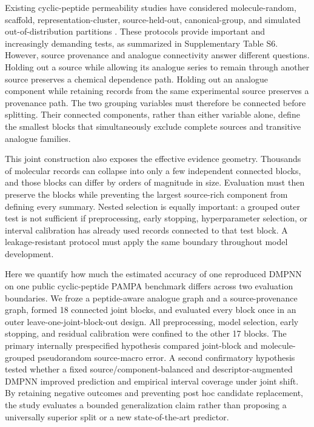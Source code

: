 \documentclass[referee,lineno,pdflatex,sn-vancouver-num]{sn-jnl}
\begin{document}
Existing cyclic-peptide permeability studies have considered molecule-random, scaffold, representation-cluster, source-held-out, canonical-group, and simulated out-of-distribution partitions \cite{geyland2024applicability,liu2025benchmark,feller2025peptideclm,wang2025multicycpermea}. These protocols provide important and increasingly demanding tests, as summarized in Supplementary Table S6. However, source provenance and analogue connectivity answer different questions. Holding out a source while allowing its analogue series to remain through another source preserves a chemical dependence path. Holding out an analogue component while retaining records from the same experimental source preserves a provenance path. The two grouping variables must therefore be connected before splitting. Their connected components, rather than either variable alone, define the smallest blocks that simultaneously exclude complete sources and transitive analogue families.

This joint construction also exposes the effective evidence geometry. Thousands of molecular records can collapse into only a few independent connected blocks, and those blocks can differ by orders of magnitude in size. Evaluation must then preserve the blocks while preventing the largest source-rich component from defining every summary. Nested selection is equally important: a grouped outer test is not sufficient if preprocessing, early stopping, hyperparameter selection, or interval calibration has already used records connected to that test block. A leakage-resistant protocol must apply the same boundary throughout model development.

Here we quantify how much the estimated accuracy of one reproduced DMPNN on one public cyclic-peptide PAMPA benchmark differs across two evaluation boundaries. We froze a peptide-aware analogue graph and a source-provenance graph, formed 18 connected joint blocks, and evaluated every block once in an outer leave-one-joint-block-out design. All preprocessing, model selection, early stopping, and residual calibration were confined to the other 17 blocks. The primary internally prespecified hypothesis compared joint-block and molecule-grouped pseudorandom source-macro error. A second confirmatory hypothesis tested whether a fixed source/component-balanced and descriptor-augmented DMPNN improved prediction and empirical interval coverage under joint shift. By retaining negative outcomes and preventing post hoc candidate replacement, the study evaluates a bounded generalization claim rather than proposing a universally superior split or a new state-of-the-art predictor.
\end{document}
